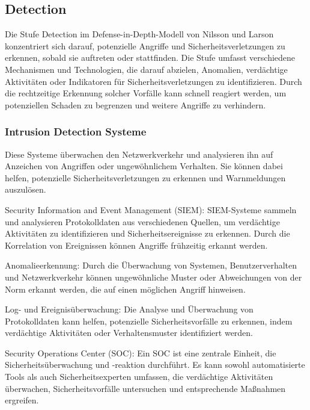 

\subsection{Detection}
Die Stufe Detection im Defense-in-Depth-Modell von Nilsson und Larson konzentriert sich darauf, potenzielle Angriffe und Sicherheitsverletzungen zu erkennen, sobald sie auftreten oder stattfinden.
Die Stufe umfasst verschiedene Mechanismen und Technologien, die darauf abzielen, Anomalien, verdächtige Aktivitäten oder Indikatoren für Sicherheitsverletzungen zu identifizieren. Durch die rechtzeitige Erkennung solcher Vorfälle kann schnell reagiert werden, um potenziellen Schaden zu begrenzen und weitere Angriffe zu verhindern.

\subsubsection{Intrusion Detection Systeme} 
Diese Systeme überwachen den Netzwerkverkehr und analysieren ihn auf Anzeichen von Angriffen oder ungewöhnlichem Verhalten. Sie können dabei helfen, potenzielle Sicherheitsverletzungen zu erkennen und Warnmeldungen auszulösen.

Security Information and Event Management (SIEM): SIEM-Systeme sammeln und analysieren Protokolldaten aus verschiedenen Quellen, um verdächtige Aktivitäten zu identifizieren und Sicherheitsereignisse zu erkennen. Durch die Korrelation von Ereignissen können Angriffe frühzeitig erkannt werden.

Anomalieerkennung: Durch die Überwachung von Systemen, Benutzerverhalten und Netzwerkverkehr können ungewöhnliche Muster oder Abweichungen von der Norm erkannt werden, die auf einen möglichen Angriff hinweisen.

Log- und Ereignisüberwachung: Die Analyse und Überwachung von Protokolldaten kann helfen, potenzielle Sicherheitsvorfälle zu erkennen, indem verdächtige Aktivitäten oder Verhaltensmuster identifiziert werden.

Security Operations Center (SOC): Ein SOC ist eine zentrale Einheit, die Sicherheitsüberwachung und -reaktion durchführt. Es kann sowohl automatisierte Tools als auch Sicherheitsexperten umfassen, die verdächtige Aktivitäten überwachen, Sicherheitsvorfälle untersuchen und entsprechende Maßnahmen ergreifen.

